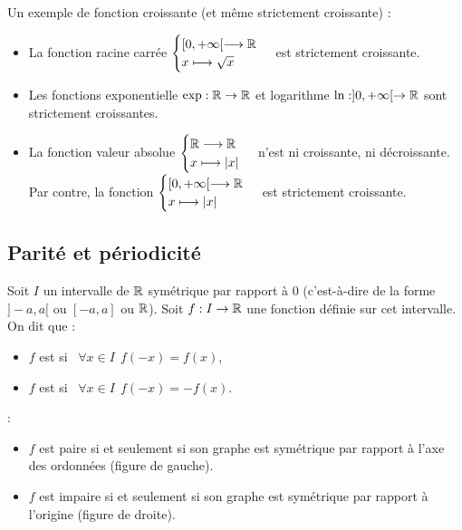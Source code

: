 \documentclass[class=report,crop=false]{standalone}
\begin{document}
Un exemple de fonction croissante (et même strictement croissante) :

\begin{exemple}
\sauteligne
\begin{itemize}
  \item  La fonction racine carrée $\begin{cases} [0,+\infty[ \longrightarrow \mathbb{R} \\
  x\longmapsto \sqrt x \end{cases}$ est strictement croissante.
  \item Les fonctions exponentielle $\exp: \mathbb{R}\to\mathbb{R}$ et logarithme $\ln :]0,+\infty[\to\mathbb{R}$
  sont strictement croissantes.
  \item La fonction valeur absolue $\begin{cases} \mathbb{R} \longrightarrow \mathbb{R} \\ x\longmapsto |x| \end{cases}$
  n'est ni croissante, ni décroissante. Par contre, la fonction
  $\begin{cases} [0,+\infty[ \longrightarrow \mathbb{R} \\ x\longmapsto |x| \end{cases}$ est strictement croissante.
\end{itemize}
\end{exemple}

\subsection{Parité et périodicité}

\begin{definition}
Soit $I$ un intervalle de $\mathbb{R}$ symétrique par rapport à $0$ (c'est-à-dire de la forme $]-a,a[$ ou $[-a,a]$ ou $\mathbb{R}$).
Soit $f:I\to \mathbb{R}$ une fonction définie sur cet intervalle. On dit que :
\begin{itemize}
  \item $f$ est  si \ $\forall x\in I \ \ f(-x)=f(x)$,
  \item $f$ est  si \ $\forall x\in I \ \ f(-x)=-f(x)$.
\end{itemize}
\end{definition}

 :
\begin{itemize}
  \item $f$ est paire si et seulement si son graphe est symétrique par rapport à l'axe des ordonnées (figure de gauche).
  \item $f$ est impaire si et seulement si son graphe est symétrique par rapport à l'origine (figure de droite).
\end{itemize}
\end{document}
